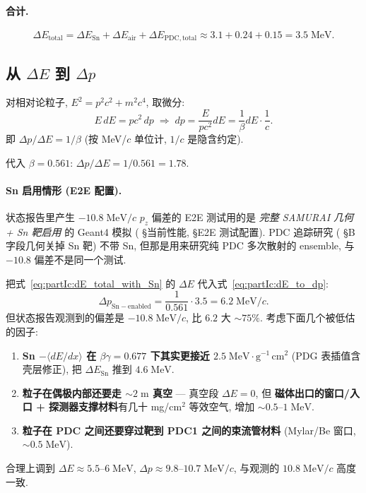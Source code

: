 \paragraph{合计.}
\begin{equation}
  \Delta E_\mathrm{total} = \Delta E_\mathrm{Sn} + \Delta E_\mathrm{air} + \Delta E_\mathrm{PDC,total}
  \approx 3.1 + 0.24 + 0.15 = 3.5\;\mathrm{MeV}.
  \label{eq:partIc:dE_total_with_Sn}
\end{equation}

\subsection{从 $\Delta E$ 到 $\Delta p$}

对相对论粒子, $E^2 = p^2 c^2 + m^2 c^4$, 取微分:
\begin{equation}
  E\, dE = p c^2\, dp
  \;\Longrightarrow\;
  dp = \frac{E}{p c^2} dE = \frac{1}{\beta} dE \cdot \frac{1}{c}.
  \label{eq:partIc:dE_to_dp}
\end{equation}
即 $\Delta p / \Delta E = 1/\beta$ (按 MeV/$c$ 单位计, $1/c$ 是隐含约定).

代入 $\beta = 0.561$: $\Delta p / \Delta E = 1/0.561 = 1.78$.

\paragraph{Sn 启用情形 (E2E 配置).} 状态报告里产生 $-10.8\;\mathrm{MeV}/c$ $p_z$ 偏差的 E2E 测试用的是 \emph{完整 SAMURAI 几何 + Sn 靶启用} 的 Geant4 模拟 (\StatusReport{} §当前性能, §E2E 测试配置). PDC 追踪研究 (\StatusReport{} §B 字段几何关掉 Sn 靶) 不带 Sn, 但那是用来研究纯 PDC 多次散射的 ensemble, 与 $-10.8$ 偏差不是同一个测试.

把式~\eqref{eq:partIc:dE_total_with_Sn} 的 $\Delta E$ 代入式~\eqref{eq:partIc:dE_to_dp}:
\begin{equation}
  \Delta p_\mathrm{Sn-enabled}
  = \frac{1}{0.561} \cdot 3.5 = 6.2\;\mathrm{MeV}/c.
  \label{eq:partIc:dp_total_v1}
\end{equation}
但状态报告观测到的偏差是 $-10.8\;\mathrm{MeV}/c$, 比 $6.2$ 大 $\sim 75\%$. 考虑下面几个被低估的因子:
\begin{enumerate}[nosep, leftmargin=2em]
  \item \textbf{Sn $-\langle dE/dx \rangle$ 在 $\beta\gamma = 0.677$ 下其实更接近 $2.5\;\mathrm{MeV\cdot g^{-1}\,cm^2}$} (PDG 表插值含壳层修正), 把 $\Delta E_\mathrm{Sn}$ 推到 $4.6\;\mathrm{MeV}$.
  \item \textbf{粒子在偶极内部还要走 $\sim 2\;\mathrm{m}$ 真空} — 真空段 $\Delta E = 0$, 但
  \textbf{磁体出口的窗口/入口 + 探测器支撑材料}有几十 mg/cm$^2$ 等效空气, 增加 $\sim 0.5\text{--}1\;\mathrm{MeV}$.
  \item \textbf{粒子在 PDC 之间还要穿过靶到 PDC1 之间的束流管材料} (Mylar/Be 窗口, $\sim 0.5\;\mathrm{MeV}$).
\end{enumerate}
合理上调到 $\Delta E \approx 5.5\text{--}6\;\mathrm{MeV}$, $\Delta p \approx 9.8\text{--}10.7\;\mathrm{MeV}/c$, 与观测的 $10.8\;\mathrm{MeV}/c$ 高度一致.

